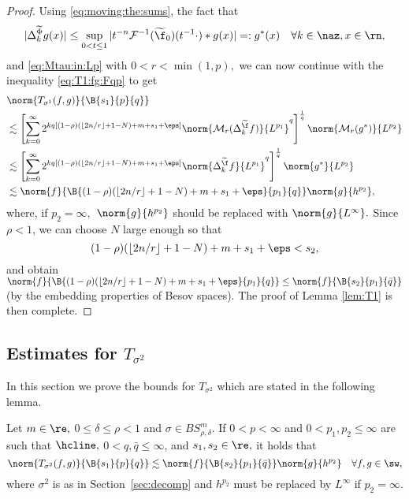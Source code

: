 \begin{proof}
Using  \eqref{eq:moving:the:sums},  the fact that  
\begin{equation}\label{def:g*}
|\Delta^{\widetilde{\Phi}}_k g(x)| \leq \sup\limits_{0 < t \le 1} |t^{-n}\mathcal{F}^{-1}(\widetilde{\f}_0)(t^{-1} \cdot)* g(x)| =: g^*(x) \quad \forall k \in \naz,  x \in \rn, 
\end{equation}
and \eqref{eq:Mtau:in:Lp} with $0<r < \min(1,p),$ we can now continue with the inequality \eqref{eq:T1:fg:Fqp} to get
\begin{align*}
& \norm{T_{\sigma^1}(f,g)}{\B{s_1}{p}{q}}\\
&  \lesssim   \left[  \sum\limits_{k=0}^\infty   2^{k q [(1-\rho)( \lfloor{2n/r}\rfloor + 1-N) + m+s_1+\eps]}  \norm{ \mathcal{M}_r(\Delta^{\widetilde{\f}}_k f)}{L^{p_1}}^q \right]^\frac{1}{q} \norm{\mathcal{M}_r(g^*)}{L^{p_2}}\\
&  \lesssim   \left[  \sum\limits_{k=0}^\infty   2^{k q [(1-\rho)( \lfloor{2n/r}\rfloor + 1-N) + m+s_1+\eps]}   \norm{\Delta^{\widetilde{\f}}_k f}{L^{p_1}}^q \right]^\frac{1}{q} \norm{g^*}{L^{p_2}}\\
& \lesssim \norm{f}{\B{(1-\rho)( \lfloor{2n/r}\rfloor + 1-N) + m + s_1+\eps }{p_1}{q}}  \norm{ g}{h^{p_2}},
\end{align*}
 where, if $p_2=\infty,$  $\norm{g}{h^{p_2}}$ should be replaced with $\norm{g}{L^\infty}.$ Since $\rho<1$, we can choose $N$ large enough so that
$$
(1-\rho)( \lfloor{2n/r}\rfloor + 1-N) + m +s_1 +\eps  < s_2,
$$
and obtain $ \norm{f}{\B{(1-\rho)( \lfloor{2n/r}\rfloor + 1-N) + m +s_1+ \eps }{p_1}{q}} \leq  \norm{f}{\B{s_2}{p_1}{\bar{q}}}$ (by the embedding properties of Besov spaces). The proof of Lemma \ref{lem:T1} is then complete.

\end{proof}

\subsection{Estimates for $T_{\sigma^2}$}\label{sec:T2}

In this section we prove the bounds for $T_{\sigma^2}$ which are stated in the following lemma.

\begin{lemma}\label{lem:T2} 
Let $m \in \re,$ $0 \le \delta\le \rho < 1$ and $\sigma \in BS^m_{\rho, \delta}$. If $0<p<\infty$ and $0< p_1, p_2 \le \infty$ are such that $\hcline,$ $0 < q,\bar{q} \leq \infty$, and $s_1, s_2 \in \re,$ it holds that
\begin{equation}\label{eq:T2}
\norm{T_{\sigma^2}(f,g)}{\B{s_1}{p}{q}}  \lesssim \norm{f}{\B{s_2}{p_1}{\bar{q}}} \norm{g}{h^{p_2}} \quad \forall f, g \in \sw,
\end{equation}
where $\sigma^2$ is as in Section~\ref{sec:decomp} and $h^{p_2}$ must be replaced by $L^\infty$ if $p_2=\infty.$
\end{lemma}

